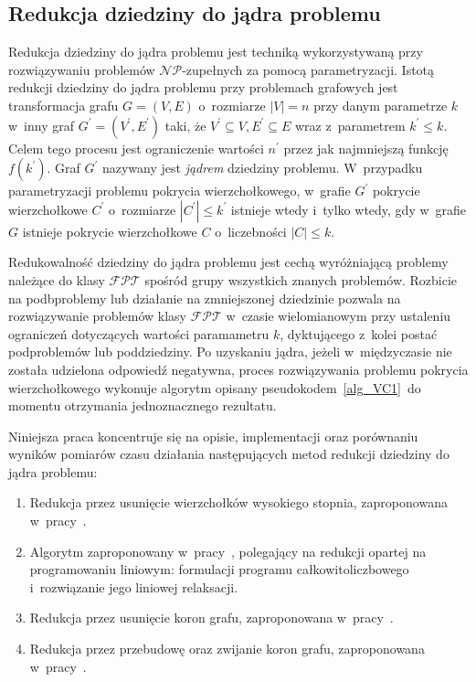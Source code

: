 \subsection{Redukcja dziedziny do jądra problemu}\label{subsection_kernelization}
\par{
  Redukcja dziedziny do jądra problemu jest techniką wykorzystywaną przy
  rozwiązywaniu problemów $\mathcal{NP}$-zupełnych za pomocą parametryzacji.
  Istotą redukcji dziedziny do jądra problemu przy problemach grafowych
  jest transformacja grafu $G=(V,E)$ o~rozmiarze $|V|=n$ przy danym parametrze $k$ w~inny
  graf $G^{\prime}=(V^{\prime}, E^{\prime})$ taki, że $V^{\prime} \subseteq V, E^{\prime} \subseteq E$
  wraz z~parametrem $k^{\prime} \leq k$.
  Celem tego procesu jest ograniczenie wartości $n^{\prime}$ przez jak najmniejszą
  funkcję $f(k^{\prime})$.
  Graf $G^{\prime}$ nazywany jest \emph{jądrem} dziedziny problemu.
  W~przypadku parametryzacji problemu pokrycia wierzchołkowego, w~grafie
  $G^{\prime}$ pokrycie wierzchołkowe $C^{\prime}$ o~rozmiarze $|C^{\prime}|\leq k^{\prime}$ istnieje wtedy i~tylko wtedy, gdy w~grafie $G$ istnieje pokrycie wierzchołkowe $C$ o~liczebności $|C| \leq k$.
}
\par{
  Redukowalność dziedziny do jądra problemu jest cechą wyróżniającą problemy 
  należące do klasy $\mathcal{FPT}$ spośród grupy wszystkich znanych problemów.
  Rozbicie na podbproblemy lub działanie na zmniejszonej dziedzinie pozwala na
  rozwiązywanie problemów klasy $\mathcal{FPT}$ w~czasie wielomianowym przy
  ustaleniu ograniczeń dotyczących wartości paramametru $k$, dyktującego z~kolei
  postać podproblemów lub poddziedziny.
  Po uzyskaniu jądra, jeżeli w~międzyczasie nie została udzielona odpowiedź negatywna, proces rozwiązywania problemu pokrycia wierzchołkowego
  wykonuje algorytm opisany pseudokodem~\ref{alg_VC1}\ do momentu otrzymania jednoznacznego rezultatu.
}
\par{
  Niniejsza praca koncentruje się na opisie, implementacji oraz porównaniu wyników pomiarów czasu działania następujących metod redukcji dziedziny do
  jądra problemu:
  \begin{enumerate}
    \item Redukcja przez usunięcie wierzchołków wysokiego stopnia, zaproponowana
      w~pracy~\cite{KernelizationAlgorithms04}.
    \item Algorytm zaproponowany w~pracy~\cite{KernelizationAlgorithms04}, polegający
      na redukcji opartej na programowaniu liniowym: formulacji programu
      całkowitoliczbowego i~rozwiązanie jego liniowej relaksacji.
    \item Redukcja przez usunięcie koron grafu, zaproponowana
      w~pracy~\cite{abukhzam03}.
    \item Redukcja przez przebudowę oraz zwijanie koron grafu, zaproponowana
      w~pracy~\cite{ImprovedBounds10}.
  \end{enumerate}
}
